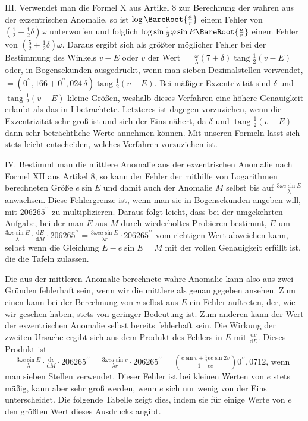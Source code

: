 III. Verwendet man die Formel X aus Artikel 8 zur Berechnung der wahren aus der exzentrischen Anomalie, so ist $\log\BareRoot{\frac{a}{r}}$ einem Fehler von $(\frac{1}{2}+\frac{1}{2}\delta)\omega$ unterworfen und folglich $\log\sin\frac{1}{2}\varphi\sin E\BareRoot{\frac{a}{r}}$ einem Fehler von $(\frac{5}{2}+\frac{1}{2}\delta)\omega$. Daraus ergibt sich als größter möglicher Fehler bei der Bestimmung des Winkels $v-E$ oder $v$ der Wert $=\frac{\omega}{\lambda}(7+\delta)\operatorname{tang}\frac{1}{2}(v-E)$ oder, in Bogensekunden ausgedrückt, wenn man sieben Dezimalstellen verwendet, $=(0^{\prime\prime}{,}166+0^{\prime\prime}{,}024\,\delta)\operatorname{tang}\frac{1}{2}(v-E)$. Bei mäßiger Exzentrizität sind $\delta$ und $\operatorname{tang}\frac{1}{2}(v-E)$ kleine Größen, weshalb dieses Verfahren eine höhere Genauigkeit erlaubt als das in I betrachtete. Letzteres ist dagegen vorzuziehen, wenn die Exzentrizität sehr groß ist und sich der Eins nähert, da $\delta$ und $\operatorname{tang}\frac{1}{2}(v-E)$ dann sehr beträchtliche Werte annehmen können. Mit unseren Formeln lässt sich stets leicht entscheiden, welches Verfahren vorzuziehen ist.

IV. Bestimmt man die mittlere Anomalie aus der exzentrischen Anomalie nach Formel XII aus Artikel 8, so kann der Fehler der mithilfe von Logarithmen berechneten Größe $e\sin E$ und damit auch der Anomalie $M$ selbst bis auf $\frac{3\omega e\sin E}{\lambda}$ anwachsen. Diese Fehlergrenze ist,
wenn man sie in Bogensekunden angeben will, mit $206265^{\prime\prime}$ zu multiplizieren. Daraus folgt leicht, dass bei der umgekehrten Aufgabe, bei der man $E$ aus $M$ durch wiederholtes Probieren bestimmt, $E$ um $\frac{3\omega e\sin E}{\lambda}\cdot\frac{\mathrm{d}E}{\mathrm{d}M}\cdot206265^{\prime\prime}=\frac{3\omega ea\sin E}{\lambda r}\cdot206265^{\prime\prime}$ vom richtigen Wert abweichen kann, selbst wenn die Gleichung $E-e\sin E=M$ mit der vollen Genauigkeit erfüllt ist, die die Tafeln zulassen.

Die aus der mittleren Anomalie berechnete wahre Anomalie kann also aus zwei Gründen fehlerhaft sein, wenn wir die mittlere als genau gegeben ansehen. Zum einen kann bei der Berechnung von $v$ selbst aus $E$ ein Fehler auftreten, der, wie wir gesehen haben, stets von geringer Bedeutung ist. Zum anderen kann der Wert der exzentrischen Anomalie selbst bereits fehlerhaft sein. Die Wirkung der zweiten Ursache ergibt sich aus dem Produkt des Fehlers in $E$ mit $\frac{\mathrm{d}v}{\mathrm{d}E}$. Dieses Produkt ist $=\frac{3\omega e\sin E}{\lambda}\cdot\frac{\mathrm{d}v}{\mathrm{d}M}\cdot206265^{\prime\prime}=\frac{3\omega ea\sin v}{\lambda r}\cdot206265^{\prime\prime}=\left(\frac{e\sin v+\frac{1}{2}ee\sin 2v}{1-ee}\right)0^{\prime\prime}{,}0712$, wenn man sieben Stellen verwendet. Dieser Fehler ist bei kleinen Werten von $e$ stets mäßig, kann aber sehr groß werden, wenn $e$ sich nur wenig von der Eins unterscheidet. Die folgende Tabelle zeigt dies, indem sie für einige Werte von $e$ den größten Wert dieses Ausdrucks angibt.

